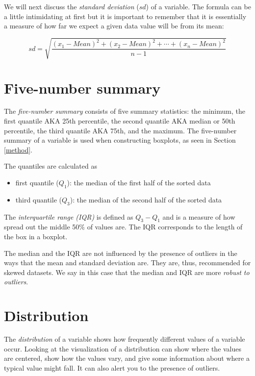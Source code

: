\documentclass[
  12pt,
  a4paper,
  oneside]{book}
\providecommand{\tightlist}{%
  \setlength{\itemsep}{0pt}\setlength{\parskip}{0pt}}
\begin{document}
We will next discuss the \emph{standard deviation} (\(sd\)) of a variable. The formula can be a little intimidating at first but it is important to remember that it is essentially a measure of how far we expect a given data value will be from its mean:

\[sd = \sqrt{\frac{(x_1 - Mean)^2 + (x_2 - Mean)^2 + \cdots + (x_n - Mean)^2}{n - 1}}\]

\hypertarget{five-number-summary}{%
\section{Five-number summary}\label{five-number-summary}}

The \emph{five-number summary} consists of five summary statistics: the minimum, the first quantile AKA 25th percentile, the second quantile AKA median or 50th percentile, the third quantile AKA 75th, and the maximum. The five-number summary of a variable is used when constructing boxplots, as seen in Section \ref{method}.

The quantiles are calculated as

\begin{itemize}
\tightlist
\item
  first quantile (\(Q_1\)): the median of the first half of the sorted data
\item
  third quantile (\(Q_3\)): the median of the second half of the sorted data
\end{itemize}

The \emph{interquartile range (IQR)} is defined as \(Q_3 - Q_1\) and is a measure of how spread out the middle 50\% of values are. The IQR corresponds to the length of the box in a boxplot.

The median and the IQR are not influenced by the presence of outliers in the ways that the mean and standard deviation are. They are, thus, recommended for skewed datasets. We say in this case that the median and IQR are more \emph{robust to outliers}.

\hypertarget{distribution}{%
\section{Distribution}\label{distribution}}

The \emph{distribution} of a variable shows how frequently different values of a variable occur. Looking at the visualization of a distribution can show where the values are centered, show how the values vary, and give some information about where a typical value might fall. It can also alert you to the presence of outliers.
\end{document}
